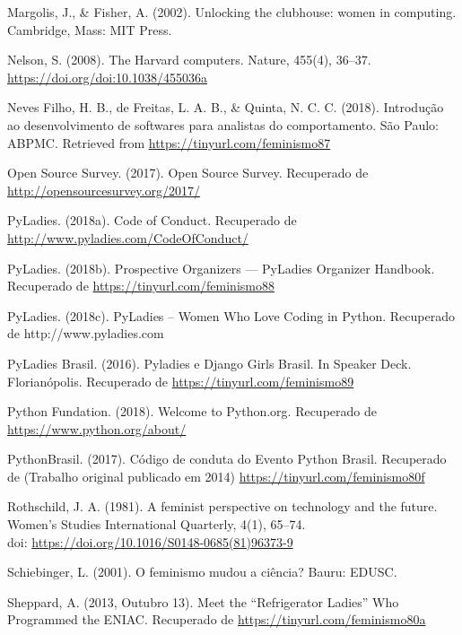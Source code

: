 \hangindent=25pt
\noindent Margolis, J., \& Fisher, A. (2002). Unlocking the clubhouse: women in computing. Cambridge, Mass: MIT Press.

\hangindent=25pt
\noindent Nelson, S. (2008). The Harvard computers. Nature, 455(4), 36–37. \url{https://doi.org/doi:10.1038/455036a}

\hangindent=25pt
\noindent Neves Filho, H. B., de Freitas, L. A. B., \& Quinta, N. C. C. (2018). Introdução ao desenvolvimento de softwares para analistas do comportamento. São Paulo: ABPMC. Retrieved from \url{https://tinyurl.com/feminismo87}

\hangindent=25pt
\noindent Open Source Survey. (2017). Open Source Survey. Recuperado de \url{http://opensourcesurvey.org/2017/}

\hangindent=25pt
\noindent PyLadies. (2018a). Code of Conduct. Recuperado de \url{http://www.pyladies.com/CodeOfConduct/}

\hangindent=25pt
\noindent PyLadies. (2018b). Prospective Organizers — PyLadies Organizer Handbook. Recuperado de \url{https://tinyurl.com/feminismo88}

\hangindent=25pt
\noindent PyLadies. (2018c). PyLadies – Women Who Love Coding in Python. Recuperado de http://www.pyladies.com

\hangindent=25pt
\noindent PyLadies Brasil. (2016). Pyladies e Django Girls Brasil. In Speaker Deck. Florianópolis. Recuperado de \url{https://tinyurl.com/feminismo89}

\hangindent=25pt
\noindent Python Fundation. (2018). Welcome to Python.org. Recuperado de \url{https://www.python.org/about/}

\hangindent=25pt
\noindent PythonBrasil. (2017). Código de conduta do Evento Python Brasil. Recuperado de \url{} (Trabalho original publicado em 2014) \url{https://tinyurl.com/feminismo80f}

\hangindent=25pt
\noindent Rothschild, J. A. (1981). A feminist perspective on technology and the future. Women’s Studies International Quarterly, 4(1), 65–74.\\ doi: \url{https://doi.org/10.1016/S0148-0685(81)96373-9}

\hangindent=25pt
\noindent Schiebinger, L. (2001). O feminismo mudou a ciência? Bauru: EDUSC.

\hangindent=25pt
\noindent Sheppard, A. (2013, Outubro 13). Meet the “Refrigerator Ladies” Who Programmed the ENIAC. Recuperado de \url{https://tinyurl.com/feminismo80a}

